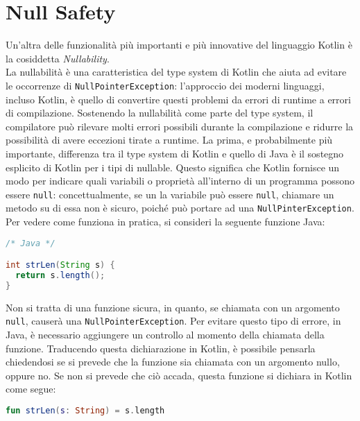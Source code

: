 \section{Null Safety}
Un'altra delle funzionalità più importanti e più innovative del linguaggio Kotlin è la cosiddetta {\em Nullability}.\\
La nullabilità è una caratteristica del type system di Kotlin che aiuta ad evitare le occorrenze di \texttt{NullPointerException}: l'approccio dei moderni linguaggi, incluso Kotlin, è quello di convertire questi problemi da errori di runtime a errori di compilazione. Sostenendo la nullabilità come parte del type system, il compilatore può rilevare molti errori possibili durante la compilazione e ridurre la possibilità di avere eccezioni tirate a runtime. La prima, e probabilmente più importante, differenza tra il type system di Kotlin e quello di Java è il sostegno esplicito di Kotlin per i tipi di nullable. Questo significa che Kotlin fornisce un modo per indicare quali variabili o proprietà all'interno di un programma possono essere \texttt{null}: concettualmente, se un la variabile può essere \texttt{null}, chiamare un metodo su di essa non è sicuro, poiché può portare ad una \texttt{NullPinterException}. Per vedere come funziona in pratica, si consideri la seguente funzione Java:\\

\begin{lstlisting}[caption={Funzione \texttt{strLen} definita in Java}, captionpos=b, label={lst:exampleNullJava}, language=Java]
/* Java */

int strLen(String s) {
  return s.length();
}
\end{lstlisting}
Non si tratta di una funzione sicura, in quanto, se chiamata con un argomento \texttt{null}, causerà una \texttt{NullPointerException}. Per evitare questo tipo di errore, in Java, è necessario aggiungere un controllo al momento della chiamata della funzione. Traducendo questa dichiarazione in Kotlin, è possibile pensarla chiedendosi se si prevede che la funzione sia chiamata con un argomento nullo, oppure no. Se non si prevede che ciò accada, questa funzione si dichiara in Kotlin come segue:\\

\begin{lstlisting}[caption={Funzione Kotlin che non accetta \texttt{null} come argomento}, captionpos=b, label={lst:exampleNullKt}, language=Kotlin]
fun strLen(s: String) = s.length
\end{lstlisting}

